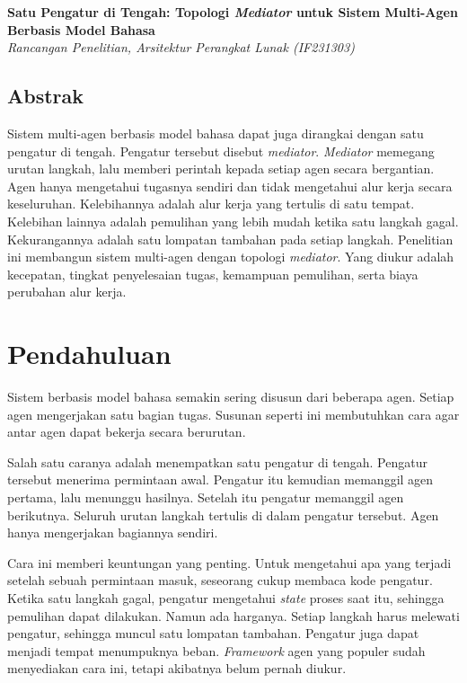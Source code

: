 \documentclass[11pt,a4paper]{article}
\begin{document}
\begin{center}
  {\LARGE\bfseries Satu Pengatur di Tengah: Topologi \textit{Mediator} untuk Sistem Multi-Agen Berbasis Model Bahasa}\\[0.6em]
  {\small\itshape Rancangan Penelitian, Arsitektur Perangkat Lunak (IF231303)}
\end{center}

\vspace{1em}

\subsection*{Abstrak}

Sistem multi-agen berbasis model bahasa dapat juga dirangkai dengan satu pengatur di tengah. Pengatur tersebut disebut \textit{mediator}. \textit{Mediator} memegang urutan langkah, lalu memberi perintah kepada setiap agen secara bergantian. Agen hanya mengetahui tugasnya sendiri dan tidak mengetahui alur kerja secara keseluruhan. Kelebihannya adalah alur kerja yang tertulis di satu tempat. Kelebihan lainnya adalah pemulihan yang lebih mudah ketika satu langkah gagal. Kekurangannya adalah satu lompatan tambahan pada setiap langkah. Penelitian ini membangun sistem multi-agen dengan topologi \textit{mediator}. Yang diukur adalah kecepatan, tingkat penyelesaian tugas, kemampuan pemulihan, serta biaya perubahan alur kerja.

\section{Pendahuluan}

Sistem berbasis model bahasa semakin sering disusun dari beberapa agen. Setiap agen mengerjakan satu bagian tugas. Susunan seperti ini membutuhkan cara agar antar agen dapat bekerja secara berurutan.

Salah satu caranya adalah menempatkan satu pengatur di tengah. Pengatur tersebut menerima permintaan awal. Pengatur itu kemudian memanggil agen pertama, lalu menunggu hasilnya. Setelah itu pengatur memanggil agen berikutnya. Seluruh urutan langkah tertulis di dalam pengatur tersebut. Agen hanya mengerjakan bagiannya sendiri.

Cara ini memberi keuntungan yang penting. Untuk mengetahui apa yang terjadi setelah sebuah permintaan masuk, seseorang cukup membaca kode pengatur. Ketika satu langkah gagal, pengatur mengetahui \textit{state} proses saat itu, sehingga pemulihan dapat dilakukan. Namun ada harganya. Setiap langkah harus melewati pengatur, sehingga muncul satu lompatan tambahan. Pengatur juga dapat menjadi tempat menumpuknya beban. \textit{Framework} agen yang populer sudah menyediakan cara ini, tetapi akibatnya belum pernah diukur.
\end{document}

